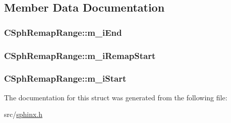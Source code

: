 \subsection{Member Data Documentation}
\hypertarget{structCSphRemapRange_a67482e621525e0338ef4266448b5d84b}{
\subsubsection[{m\-\_\-i\-End}]{ C\-Sph\-Remap\-Range\-::m\-\_\-i\-End}}\label{structCSphRemapRange_a67482e621525e0338ef4266448b5d84b}
\hypertarget{structCSphRemapRange_a1b7062de3d8bfe002d16d5a1ee09c341}{
\subsubsection[{m\-\_\-i\-Remap\-Start}]{ C\-Sph\-Remap\-Range\-::m\-\_\-i\-Remap\-Start}}\label{structCSphRemapRange_a1b7062de3d8bfe002d16d5a1ee09c341}
\hypertarget{structCSphRemapRange_aae595e8e408fa266328b2542186140a4}{
\subsubsection[{m\-\_\-i\-Start}]{ C\-Sph\-Remap\-Range\-::m\-\_\-i\-Start}}\label{structCSphRemapRange_aae595e8e408fa266328b2542186140a4}


The documentation for this struct was generated from the following file\-:\begin{DoxyCompactItemize}
\item 
src/\hyperlink{sphinx_8h}{sphinx.\-h}\end{DoxyCompactItemize}
